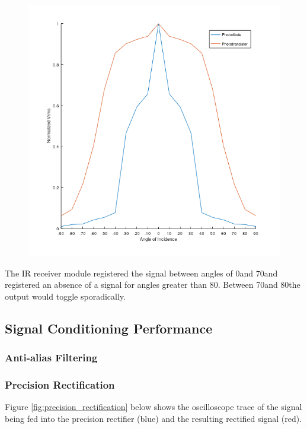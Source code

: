 \begin{figure}[H]
\begin{minipage}{.4\linewidth}
		\includegraphics[width=\textwidth]{figures/results/beam_pattern_square.png}
		\label{fig:beam_pattern}
	\end{minipage}
\end{figure}

The IR receiver module registered the signal between angles of 0\textdegree and 70\textdegree and registered an absence of a signal for angles greater than 80\textdegree. Between 70\textdegree and 80\textdegree the output would toggle sporadically.

\subsection{Signal Conditioning Performance}

\subsubsection{Anti-alias Filtering}

\subsubsection{Precision Rectification}

Figure \ref{fig:precision_rectification} below shows the oscilloscope trace of the signal being fed into the precision rectifier (blue) and the resulting rectified signal (red).

